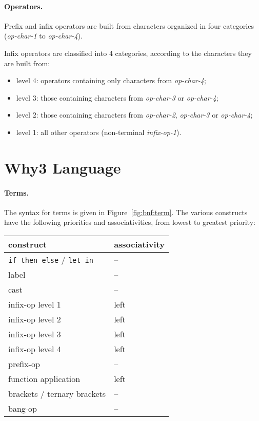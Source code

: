 \paragraph{Operators.}
Prefix and infix operators are built from characters organized in four
categories (\textsl{op-char-1} to \textsl{op-char-4}).
\begin{center}\framebox{}\end{center}
Infix operators are classified into 4 categories, according to the
characters they are built from:
\begin{itemize}
\item level 4: operators containing only characters from
\textit{op-char-4};
\item level 3: those containing
 characters from \textit{op-char-3} or \textit{op-char-4};
\item level 2: those containing
 characters from \textit{op-char-2}, \textit{op-char-3} or
 \textit{op-char-4};
\item level 1: all other operators (non-terminal \textit{infix-op-1}).
\end{itemize}

\section{Why3 Language}

\paragraph{Terms.}
The syntax for terms is given in Figure~\ref{fig:bnf:term}.
The various constructs have the following priorities and
associativities, from lowest to greatest priority:
\begin{center}
  \begin{tabular}{|l|l|}
    \hline
    construct & associativity \\
    \hline\hline
    \texttt{if then else} / \texttt{let in} & -- \\
    label & -- \\
    cast  & -- \\
    infix-op level 1 & left \\
    infix-op level 2 & left \\
    infix-op level 3 & left \\
    infix-op level 4 & left \\
    prefix-op     & --   \\
    function application & left \\
    brackets / ternary brackets & -- \\
    bang-op       & --   \\
    \hline
  \end{tabular}
\end{center}

